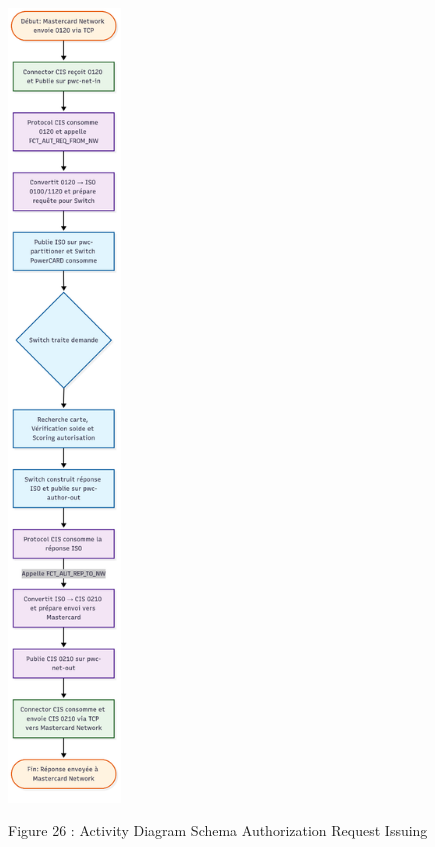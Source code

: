 \documentclass[12pt,a4paper]{report}
\begin{document}
\includegraphics[width=1.18158in,height=8.27795in]{vertopal_d1b0b2209edd4c6aa8254f57daa0953b/media/image45.png}

\protect\hypertarget{_Toc201954502}{}{}Figure 26 : Activity Diagram
Schema Authorization Request Issuing
\end{document}

